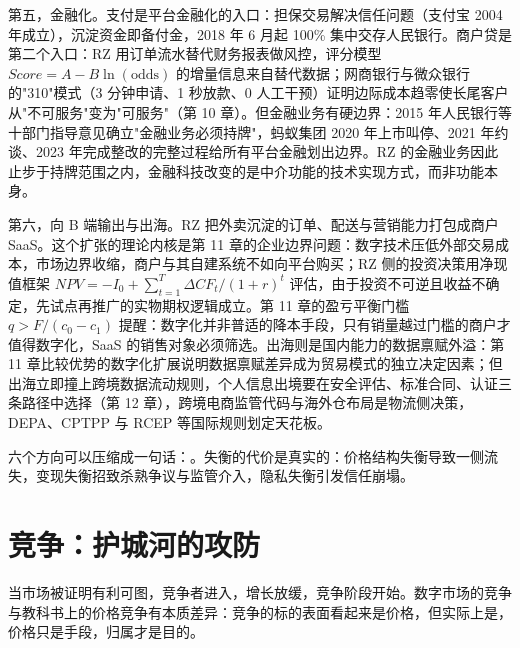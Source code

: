 第五，金融化。支付是平台金融化的入口：担保交易解决信任问题（支付宝 2004 年成立），沉淀资金即备付金，2018 年 6 月起 100\% 集中交存人民银行。商户贷是第二个入口：RZ 用订单流水替代财务报表做风控，评分模型 $Score=A-B\ln(\text{odds})$ 的增量信息来自替代数据；网商银行与微众银行的"310"模式（3 分钟申请、1 秒放款、0 人工干预）证明边际成本趋零使长尾客户从"不可服务"变为"可服务"（第 10 章）。但金融业务有硬边界：2015 年人民银行等十部门指导意见确立"金融业务必须持牌"，蚂蚁集团 2020 年上市叫停、2021 年约谈、2023 年完成整改的完整过程给所有平台金融划出边界。RZ 的金融业务因此止步于持牌范围之内，金融科技改变的是中介功能的技术实现方式，而非功能本身。

第六，向 B 端输出与出海。RZ 把外卖沉淀的订单、配送与营销能力打包成商户 SaaS。这个扩张的理论内核是第 11 章的企业边界问题：数字技术压低外部交易成本，市场边界收缩，商户与其自建系统不如向平台购买；RZ 侧的投资决策用净现值框架 $NPV=-I_0+\sum_{t=1}^{T}\Delta CF_t/(1+r)^t$ 评估，由于投资不可逆且收益不确定，先试点再推广的实物期权逻辑成立。第 11 章的盈亏平衡门槛 $q>F/(c_0-c_1)$ 提醒：数字化并非普适的降本手段，只有销量越过门槛的商户才值得数字化，SaaS 的销售对象必须筛选。出海则是国内能力的数据禀赋外溢：第 11 章比较优势的数字化扩展说明数据禀赋差异成为贸易模式的独立决定因素；但出海立即撞上跨境数据流动规则，个人信息出境要在安全评估、标准合同、认证三条路径中选择（第 12 章），跨境电商监管代码与海外仓布局是物流侧决策，DEPA、CPTPP 与 RCEP 等国际规则划定天花板。

六个方向可以压缩成一句话：。失衡的代价是真实的：价格结构失衡导致一侧流失，变现失衡招致杀熟争议与监管介入，隐私失衡引发信任崩塌。

\section{竞争：护城河的攻防}

当市场被证明有利可图，竞争者进入，增长放缓，竞争阶段开始。数字市场的竞争与教科书上的价格竞争有本质差异：竞争的标的表面看起来是价格，但实际上是，价格只是手段，归属才是目的。

